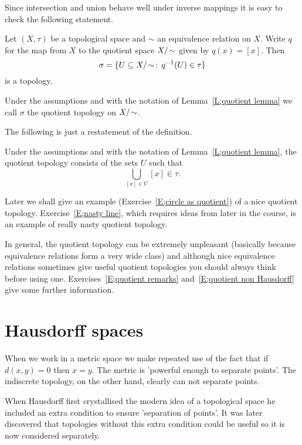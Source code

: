Since intersection and union behave well under
inverse mappings it is 
easy to check the following statement.
\begin{lemma}\label{L;quotient lemma} 
Let $(X,\tau)$ be a topological space
and $\sim$ an equivalence relation on $X$.
Write $q$ for the map from $X$ to the 
quotient space $X/\negthinspace\sim$
given by $q(x)=[x]$. Then
\[\sigma=\{U\subseteq X/\negthinspace\sim\,:\,q^{-1}(U)\in\tau\}\]
is a topology.
\end{lemma}
\begin{definition} Under the assumptions and with the notation
of Lemma~\ref{L;quotient lemma} we call $\sigma$ the quotient
topology on $X/\negthinspace\sim$.
\end{definition}
The following is just a restatement of the definition.
\begin{lemma} Under the assumptions and with the notation
of Lemma~\ref{L;quotient lemma}, the quotient topology
consists of the sets $U$ such that
\[\bigcup_{[x]\in U}[x]\in\tau.\]
\end{lemma}
Later we shall give an example (Exercise~\ref{E;circle as quotient})
of a nice quotient topology.
Exercise~\ref{E;nasty line}, which requires
ideas from later in the course, is an example of really
nasty  quotient topology.

In general, the quotient topology can be extremely
unpleasant (basically because equivalence relations
form a very wide class) and although nice equivalence
relations sometimes give useful quotient topologies
you should always think before using one.
Exercises~\ref{E;quotient remarks} and~\ref{E;quotient non Hausdorff}
give some further information.

















\section{Hausdorff spaces}\label{S;Hausdorff spaces} 
When we work in a metric space we make
repeated use of the fact that if $d(x,y)=0$ then $x=y$.
The metric is 'powerful enough to separate points'.
The indiscrete topology, on the other hand, clearly
can not separate points.

When Hausdorff first crystallised the modern idea
of a topological space he included an extra condition
to ensure 'separation of points'. It was later
discovered that topologies without this extra condition
could be useful so it is now considered separately.

